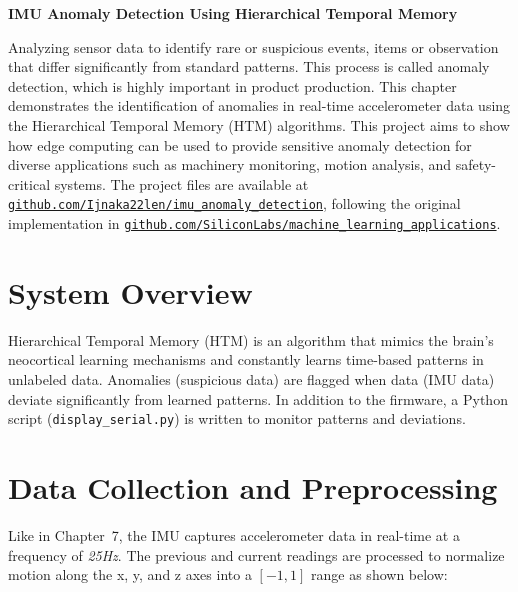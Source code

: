 \documentclass[
  9pt,
  letterpaper,
  abstract,
  titlepage]{scrbook}
\makeatletter
\renewcommand\chapter{\clearpage\global\@topnum\z@
\@afterindentfalse \secdef\@chapter\@schapter}
\newif\if@firstnumbered%
\newif\if@firstunnumbered%
\newcounter{lastRomanPage}
\let\old@chapter\chapter%
\renewcommand{\chapter}{%
  \@ifstar{\unnumbered@chapter}{\numbered@chapter}%
}
\newcommand{\numbered@chapter}[1]{%
  \if@firstnumbered%
    \cleardoublepage%
    \setcounter{lastRomanPage}{\value{page}}%
    \pagenumbering{arabic}%
    \@firstnumberedfalse%
  \else
    \setcounter{page}{\value{page}}%
  \fi
  \old@chapter{#1}%
}
\newcommand{\unnumbered@chapter}[1]{%
  \if@firstunnumbered%
    \clearpage
    \setcounter{lastRomanPage}{\value{page}}%
    \pagenumbering{roman}%
    \@firstunnumberedfalse%
  \fi
  \old@chapter*{#1}%
}
\makeatother
\begin{document}
\chapter{\texorpdfstring{\textbf{IMU Anomaly Detection Using
Hierarchical Temporal
Memory}}{IMU Anomaly Detection Using Hierarchical Temporal Memory}}\label{imu-anomaly-detection-using-hierarchical-temporal-memory}

Analyzing sensor data to identify rare or suspicious events, items or
observation that differ significantly from standard patterns. This
process is called anomaly detection, which is highly important in
product production. This chapter demonstrates the identification of
anomalies in real-time accelerometer data using the Hierarchical
Temporal Memory (HTM) algorithms. This project aims to show how edge
computing can be used to provide sensitive anomaly detection for diverse
applications such as machinery monitoring, motion analysis, and
safety-critical systems. The project files are available at
\href{https://github.com/Ijnaka22len/imu_anomaly_detection}{\texttt{github.com/Ijnaka22len/imu\_anomaly\_detection}},
following the original implementation in
\href{https://github.com/SiliconLabs/machine_learning_applications/tree/main/application/imu/imu_anomaly_detection}{\texttt{github.com/SiliconLabs/machine\_learning\_applications}}.

\section{System Overview}\label{system-overview-1}

Hierarchical Temporal Memory (HTM) is an algorithm that mimics the
brain's neocortical learning mechanisms and constantly learns time-based
patterns in unlabeled data. Anomalies (suspicious data) are flagged when
data (IMU data) deviate significantly from learned patterns. In addition
to the firmware, a Python script (\texttt{display\_serial.py}) is
written to monitor patterns and deviations.

\section{Data Collection and
Preprocessing}\label{data-collection-and-preprocessing}

Like in Chapter~7, the IMU captures accelerometer data in real-time at a
frequency of \emph{25Hz}. The previous and current readings are
processed to normalize motion along the x, y, and z axes into a
\([-1, 1]\) range as shown below:
\end{document}
